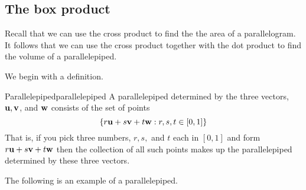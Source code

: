 \subsection{The box product}

Recall that we can use the cross product to find the the area of a parallelogram. It follows that we can use the 
cross product together with the dot product to find the volume of a parallelepiped.

We begin with a definition.

\begin{definition}{Parallelepiped}{parallelepiped}
A parallelepiped
 determined by the three vectors, ${\bf u},{\bf v}$, and ${\bf w}$ consists of the set of points
\begin{equation*}
\left\{ r{\bf u}+s{\bf v}+t{\bf w}:r,s,t\in \left[ 0,1\right]
\right\} 
\end{equation*}
That is, if you pick three numbers, $r,s,$ and $t$ each in $\left[ 0,1\right]
$ and form $r{\bf u}+s{\bf v}+t{\bf w}$ then the collection of all
such points makes up the parallelepiped
determined by these three vectors.
\end{definition}

The following is an example of a parallelepiped.

\begin{center}
\end{center}

